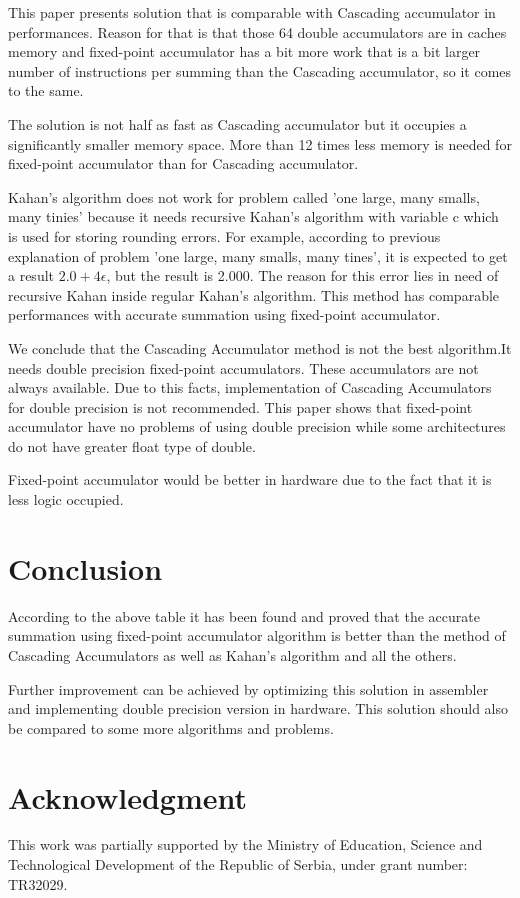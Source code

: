 \documentclass[conference]{IEEEtran}
\begin{document}
\par  
This paper presents solution that is comparable with Cascading 
accumulator in performances. Reason for that is that those 64 
double accumulators are in caches memory and fixed-point accumulator 
has a bit more work that is a bit larger number of instructions 
per summing than the Cascading accumulator, so it comes to the same.
\par 
The solution is not half as fast as Cascading accumulator but it 
occupies a significantly smaller memory space. More than 12 times 
less memory is needed for fixed-point accumulator than for Cascading accumulator.
\par 
Kahan's algorithm does not work for problem called 'one large, many smalls, many tinies'
because it needs recursive Kahan's algorithm with variable c which is used for storing rounding errors. 
For example, according to previous explanation of problem 'one large, many smalls, many tines', 
it is expected to get a result $2.0 + 4\epsilon$, but the result is 2.000. 
The reason for this error lies in need of 
recursive Kahan inside regular Kahan's algorithm. This method has 
comparable performances with accurate summation using fixed-point accumulator.
\par 
We conclude that the Cascading Accumulator method is not the
best algorithm.It needs double precision fixed-point accumulators.
These accumulators are not always available. Due to this facts, implementation of 
Cascading Accumulators for double precision is not recommended. 
This paper shows that fixed-point accumulator have no problems of 
using double precision while some architectures do not have greater float type of double. 
\par 
Fixed-point accumulator would be better in hardware due to the fact that it is less logic occupied.

\section{Conclusion}
According to the above table it has been found and proved
that the accurate summation using fixed-point accumulator 
algorithm is better than the method of Cascading Accumulators 
as well as Kahan's algorithm and all the others.
\par
Further improvement can be achieved by optimizing this
solution in assembler and implementing double precision version in hardware. 
This solution should also be compared to some more 
algorithms and problems. 

\section*{Acknowledgment}
This work was partially supported by the Ministry of Education, 
Science and Technological Development of the Republic of Serbia, 
under grant number: TR32029.




\end{document}
